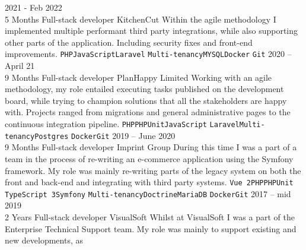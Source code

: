 \documentclass[9pt]{developercv} %
\begin{document}


\begin{entrylist}
    \entry 
    {2021 - Feb 2022\\\footnotesize{5 Months}} 
    {Full-stack developer} {KitchenCut} 
    { 
        Within the agile methodology I implemented multiple performant third
        party integrations, while also supporting other parts of the
        application. Including security fixes and front-end improvements.
        \texttt{PHP}\slashsep\texttt{JavaScript}\slashsep\texttt{Laravel}\slashsep
        \texttt{Multi-tenancy}\slashsep\texttt{MYSQL}\slashsep\texttt{Docker}
        \slashsep\texttt{Git}
    } 
    \entry 
    {2020 -- April 21\\\footnotesize{9 Months}}
    {Full-stack developer} {PlanHappy Limited}
    {
        Working with an agile methodology, my role entailed executing tasks
        published on the development board, while trying to champion solutions that
        all the stakeholders are happy with. Projects ranged from migrations and
        general administrative pages to the continuous integration pipeline.
        \texttt{PHP}\slashsep\texttt{PHPUnit}\slashsep\texttt{JavaScript}\slashsep
        \texttt{Laravel}\slashsep\texttt{Multi-tenancy}\slashsep\texttt{Postgres}
        \slashsep\texttt{Docker}\slashsep\texttt{Git}
    }
    \entry 
    {2019 -- June 2020\\\footnotesize{9 Months}}
    {Full-stack developer} {Imprint Group}
    {
        During this time I was a part of a team in the process of re-writing an
        e-commerce application using the Symfony framework. My role was mainly
        re-writing parts of the legacy system on both the front and back-end
        and integrating with third party systems.
        \texttt{Vue 2}\slashsep\texttt{PHP}\slashsep\texttt{PHPUnit}\slashsep
        \texttt{TypeScript 3}\slashsep\texttt{Symfony}\slashsep
        \texttt{Multi-tenancy}\slashsep\texttt{Doctrine}\slashsep\texttt{MariaDB}
        \slashsep\texttt{Docker}\slashsep\texttt{Git}
    }
    \entry
    {2017 -- mid 2019\\\footnotesize{2 Years}} 
    {Full-stack developer} {VisualSoft}
    {
        Whilst at VisualSoft I was a part of the Enterprise Technical Support
        team. My role was mainly to support existing and new developments, as
}
\end{entrylist}
\end{document}
